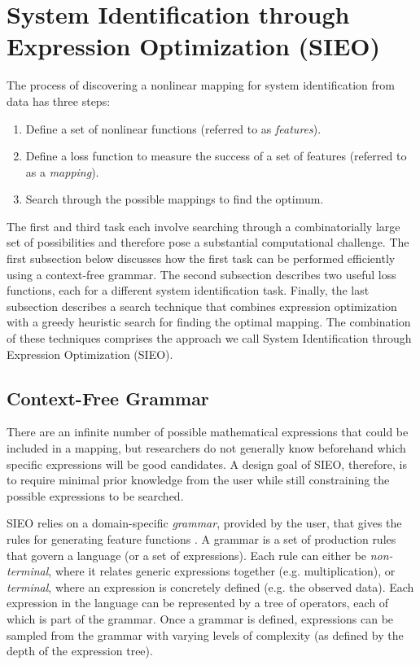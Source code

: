 \documentclass{article}
\begin{document}
\section{System Identification through Expression Optimization (SIEO)}
\label{sieo}
The process of discovering a nonlinear mapping for system identification from data has three steps:
\begin{enumerate}
    \item Define a set of nonlinear functions (referred to as \emph{features}).
    \item Define a loss function to measure the success of a set of features (referred to as a \textit{mapping}).
    \item Search through the possible mappings to find the optimum.
\end{enumerate}
The first and third task each involve searching through a combinatorially large set of possibilities and therefore pose a substantial computational challenge. The first subsection below discusses how the first task can be performed efficiently using a context-free grammar. The second subsection describes two useful loss functions, each for a different system identification task. Finally, the last subsection describes a search technique that combines expression optimization with a greedy heuristic search for finding the optimal mapping. The combination of these techniques comprises the approach we call System Identification through Expression Optimization (SIEO).

\subsection{Context-Free Grammar}

There are an infinite number of possible mathematical expressions that could be included in a mapping, but researchers do not generally know beforehand which specific expressions will be good candidates. A design goal of SIEO, therefore, is to require minimal prior knowledge from the user while still constraining the possible expressions to be searched.

SIEO relies on a domain-specific \textit{grammar}, provided by the user, that gives the rules for generating feature functions \cite{kochenderfer2019algorithms}. A grammar is a set of production rules that govern a language (or a set of expressions). Each rule can either be \textit{non-terminal}, where it relates generic expressions together (e.g. multiplication), or \textit{terminal}, where an expression is concretely defined (e.g. the observed data). Each expression in the language can be represented by a tree of operators, each of which is part of the grammar. Once a grammar is defined, expressions can be sampled from the grammar with varying levels of complexity (as defined by the depth of the expression tree).
\end{document}
